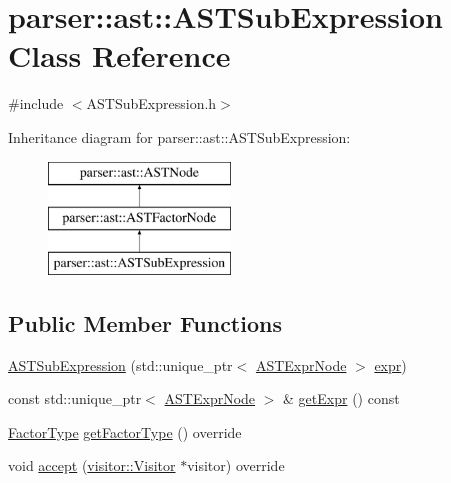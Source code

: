 \hypertarget{classparser_1_1ast_1_1ASTSubExpression}{}\section{parser\+:\+:ast\+:\+:A\+S\+T\+Sub\+Expression Class Reference}
\label{classparser_1_1ast_1_1ASTSubExpression}


{\ttfamily \#include $<$A\+S\+T\+Sub\+Expression.\+h$>$}

Inheritance diagram for parser\+:\+:ast\+:\+:A\+S\+T\+Sub\+Expression\+:\begin{figure}[H]
\begin{center}
\leavevmode
\includegraphics[height=3.000000cm]{d9/d21/classparser_1_1ast_1_1ASTSubExpression}
\end{center}
\end{figure}
\subsection*{Public Member Functions}
\begin{DoxyCompactItemize}
\item 
\hyperlink{classparser_1_1ast_1_1ASTSubExpression_ad3c1de057f3edff4ce3e30d449cf0654}{A\+S\+T\+Sub\+Expression} (std\+::unique\+\_\+ptr$<$ \hyperlink{classparser_1_1ast_1_1ASTExprNode}{A\+S\+T\+Expr\+Node} $>$ \hyperlink{classparser_1_1ast_1_1ASTSubExpression_abccfde1fa38ce0cdd3bc60993ae0e493}{expr})
\item 
const std\+::unique\+\_\+ptr$<$ \hyperlink{classparser_1_1ast_1_1ASTExprNode}{A\+S\+T\+Expr\+Node} $>$ \& \hyperlink{classparser_1_1ast_1_1ASTSubExpression_ab25ef09e54236f4e10e944b09cb23935}{get\+Expr} () const
\item 
\hyperlink{ASTFactorNode_8h_afbe2fcc03ef15b74a0c1ed1cda7ab0e8}{Factor\+Type} \hyperlink{classparser_1_1ast_1_1ASTSubExpression_a0a7ade91b1cce64eacfb9b5f6167db3f}{get\+Factor\+Type} () override
\item 
void \hyperlink{classparser_1_1ast_1_1ASTSubExpression_a684e39e8385690e9bade65731ba5803b}{accept} (\hyperlink{classvisitor_1_1Visitor}{visitor\+::\+Visitor} $\ast$visitor) override
\end{DoxyCompactItemize}
